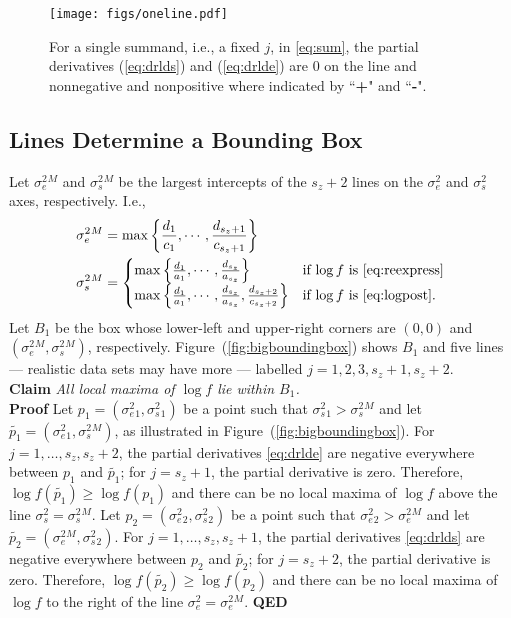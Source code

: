 \documentclass{report}
\newcommand{\RL}{f}
\newcommand{\logRL}{\log\RL}
\newcommand{\sigssq}{\sigma_s^2}
\newcommand{\sigesq}{\sigma_e^2}
\begin{document}
\begin{figure}[h]
	\centering
	\texttt{[image: figs/oneline.pdf]}
	\caption{For a single summand, i.e., a fixed $j$, in \eqref{eq:sum},
	              the partial derivatives (\ref{eq:drlds}) and (\ref{eq:drlde})
	              are 0 on the line and nonnegative and nonpositive
	              where indicated by ``\textbf{+}" and ``\textbf{-}".}
	\label{fig:oneline}
\end{figure}

\subsection{Lines Determine a Bounding Box}
\label{sec:boundingbox}

Let $\sigesq{}^M$ and $\sigssq{}^M$ be the largest intercepts of the $s_z+2$ lines on the $\sigesq$ and $\sigssq$ axes, respectively.  I.e.,
\begin{align*}
  \sigesq{}^M &= \max \left\{ \frac{d_1}{c_1}, \cdots, \frac{d_{s_z+1}}{c_{s_z+1}} \right\}\\
  \sigssq{}^M &= \begin{cases}
                             \max \left\{ \frac{d_1}{a_1}, \cdots, \frac{d_{s_z}}{a_{s_z}} \right\} &
                                  \text{if $\logRL$ is \eqref{eq:reexpress}}\\
                             \max \left\{ \frac{d_1}{a_1}, \cdots, \frac{d_{s_z}}{a_{s_z}}, \frac{d_{s_z+2}}{c_{s_z+2}} \right\} &
                                  \text{if $\logRL$ is \eqref{eq:logpost}}.
                           \end{cases}
\end{align*}
Let $B_1$ be the box whose lower-left and upper-right corners are $(0,0)$ and $(\sigesq{}^M,\sigssq{}^M)$, respectively.  Figure~(\ref{fig:bigboundingbox}) shows $B_1$ and five lines --- realistic data sets may have more --- labelled $j=1, 2, 3, s_z+1, s_z+2$.\\[5pt]
\textbf{Claim} \emph{All local maxima of $\logRL$ lie within $B_1$.}\\
\textbf{Proof} Let $p_1 = (\sigesq{}_1, \sigssq{}_1)$ be a point such that $\sigssq{}_1 > \sigssq{}^M$ and let $\widetilde{p_1} = (\sigesq{}_1, \sigssq{}^M)$, as illustrated in Figure~(\ref{fig:bigboundingbox}).  For $j=1, \dots, s_z, s_z+2$, the partial derivatives \eqref{eq:drlde} are negative everywhere between $p_1$ and $\widetilde{p_1}$; for $j=s_z+1$, the partial derivative is zero.  Therefore, $\logRL(\widetilde{p_1}) \ge \logRL(p_1)$ and there can be no local maxima of $\logRL$ above the line $\sigssq = \sigssq{}^M$.  Let $p_2 = (\sigesq{}_2, \sigssq{}_2)$ be a point such that $\sigesq{}_2 > \sigesq{}^M$ and let $\widetilde{p_2} = (\sigesq{}^M, \sigssq{}_2)$.  For $j=1, \dots, s_z, s_z+1$, the partial derivatives \eqref{eq:drlds} are negative everywhere between $p_2$ and $\widetilde{p_2}$; for $j=s_z+2$, the partial derivative is zero.   Therefore, $\logRL(\widetilde{p_2}) \ge \logRL(p_2)$ and there can be no local maxima of $\logRL$ to the right of the line $\sigesq = \sigesq{}^M$.  \textbf{QED}\\
\end{document}
